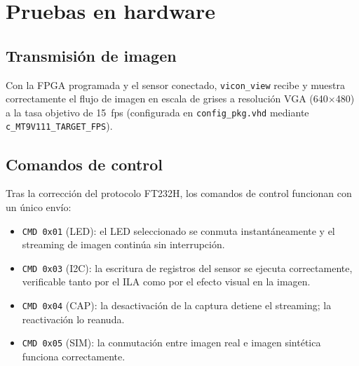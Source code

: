 \documentclass[../main.tex]{subfiles}
\begin{document}
\section{Pruebas en hardware}

\subsection{Transmisión de imagen}

Con la FPGA programada y el sensor conectado, \texttt{vicon\_view} recibe y muestra correctamente el flujo de imagen en escala de grises a resolución VGA (640$\times$480) a la tasa objetivo de 15~fps (configurada en \texttt{config\_pkg.vhd} mediante \texttt{c\_MT9V111\_TARGET\_FPS}).

\subsection{Comandos de control}

Tras la corrección del protocolo FT232H, los comandos de control funcionan con un único envío:

\begin{itemize}
    \item \texttt{CMD 0x01} (LED): el LED seleccionado se conmuta instantáneamente y el streaming de imagen continúa sin interrupción.
    \item \texttt{CMD 0x03} (I2C): la escritura de registros del sensor se ejecuta correctamente, verificable tanto por el ILA como por el efecto visual en la imagen.
    \item \texttt{CMD 0x04} (CAP): la desactivación de la captura detiene el streaming; la reactivación lo reanuda.
    \item \texttt{CMD 0x05} (SIM): la conmutación entre imagen real e imagen sintética funciona correctamente.
\end{itemize}
\end{document}
